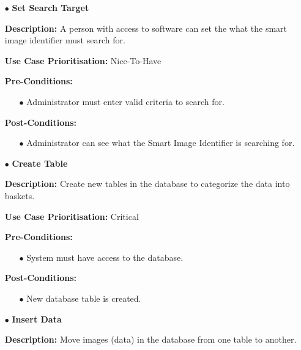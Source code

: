 \documentclass[a4paper,12pt]{report}
\begin{document}
	\begin{itemize}
		\item[$\bullet$]\textbf{Set Search Target}\newline

		\textbf{Description:} A person with access to software can set the what the smart image identifier must search for.\newline
		
		\textbf{Use Case Prioritisation:} Nice-To-Have\newline

		\textbf{Pre-Conditions:}
		\begin{itemize}
			\item[$\bullet$]Administrator must enter valid criteria to search for.
			\\
		\end{itemize}
		\textbf{Post-Conditions: }
		\begin{itemize}
			\item[$\bullet$]Administrator can see what the Smart Image Identifier is searching for.
			\\
		\end{itemize}
		\item[$\bullet$]\textbf{Create Table}\newline

		\textbf{Description:} Create new tables in the database to categorize the data into baskets.\newline
		
		\textbf{Use Case Prioritisation:} Critical\newline
		
		\textbf{Pre-Conditions:}
		\begin{itemize}
			\item[$\bullet$]System must have access to the database.
			\\
		\end{itemize}
		\textbf{Post-Conditions: }
		\begin{itemize}
			\item[$\bullet$]New database table is created.
			\\
		\end{itemize}
		\newpage
		\item[$\bullet$]\textbf{Insert Data}\newline

		\textbf{Description:} Move images (data) in the database from one table to another.\newline
		

\end{itemize}
\end{document}
